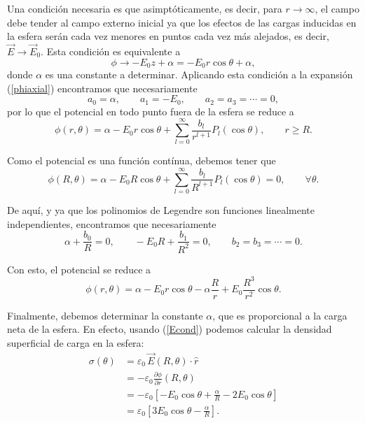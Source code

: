 Una condición necesaria es que asimptóticamente, es decir, para $r\to\infty$, el campo debe tender al campo externo inicial ya que los efectos de las cargas inducidas en la esfera serán cada vez menores en puntos cada vez más alejados, es decir, $\vec{E}\to\vec{E}_0 $. Esta condición es equivalente a 
\begin{equation}
\phi\to -E_0z+\alpha=-E_0r\cos\theta+\alpha,
\end{equation}
donde $\alpha$ es una constante a determinar. Aplicando esta condición a la expansión (\ref{phiaxial}) encontramos que necesariamente
\begin{equation}
a_0=\alpha, \qquad a_1=-E_0, \qquad a_2=a_3=\cdots =0,
\end{equation}
por lo que el potencial en todo punto  fuera de la esfera se reduce a 
\begin{equation}
\phi(r,\theta)=\alpha -E_0 r\cos\theta +
\sum_{l=0}^\infty\frac{b_l}{r^{l+1}}P_l(\cos\theta), \qquad r\ge R.
\end{equation}

Como el potencial es una función contínua, debemos tener que
\begin{equation}
\phi(R,\theta)=\alpha -E_0 R\cos\theta +
\sum_{l=0}^\infty\frac{b_l}{R^{l+1}}P_l(\cos\theta)=0, \qquad \forall \theta.
\end{equation}

De aquí, y ya que los polinomios de Legendre son funciones linealmente independientes, encontramos que necesariamente
\begin{equation}
\alpha+\frac{b_0}{R}=0, \qquad -E_0R+\frac{b_1}{R^2}=0, \qquad b_2=b_3=\cdots =0.
\end{equation}

Con esto, el potencial se reduce a
\begin{equation}\label{phialpha}
\phi(r,\theta)=\alpha -E_0 r\cos\theta -\alpha\frac{R}{r}+E_0 \frac{R^3}{r^2}\cos\theta. 
\end{equation}

Finalmente, debemos determinar la constante $\alpha$, que es proporcional a la carga neta de la esfera. En efecto, usando (\ref{Econd}) podemos calcular la densidad superficial de carga en la esfera:
\begin{align}
\sigma(\theta) &= \varepsilon_0\, \vec{E}(R,\theta)\cdot\hat{r} \\
&= -\varepsilon_0 \frac{\partial\phi}{\partial r}(R,\theta) \\
&= -\varepsilon_0\left[-E_0\cos\theta+\frac{\alpha}{R}-2E_0\cos\theta\right]\\
&= \varepsilon_0\left[3E_0\cos\theta-\frac{\alpha}{R}\right].
\end{align}

